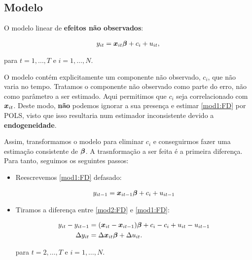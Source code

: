 \documentclass[11pt,oneside,a4paper]{article}
\numberwithin{equation}{section}
\begin{document}
\begin{description}
\subsection*{Modelo}

O modelo linear de \textbf{efeitos não observados}:

\vspace{-1 em}
\begin{align} \label{mod1:FD}
	y_{it} = \boldsymbol{x}_{it} \boldsymbol{\beta} + c_{i} + u_{it},
\end{align}

\noindent
para
$t = 1, \dots, T$ e $i = 1, \dots, N$.

O modelo contém explicitamente um componente não observado, $c_{i}$, que não varia no tempo.
Tratamos o componente não observado como parte do erro, não como parâmetro a ser estimado.
Aqui permitimos que $c_{i}$ seja correlacionado com $\boldsymbol{x}_{it}$.
Deste modo, \textbf{não} podemos ignorar a sua presença e estimar \eqref{mod1:FD} por POLS, visto que isso resultaria num estimador inconsistente devido a \textbf{endogeneidade}.

Assim, transformamos o modelo para eliminar $c_{i}$ e conseguirmos fazer uma estimação consistente de $\boldsymbol{\beta}$.
A trasnformação a ser feita é a primeira diferença.
Para tanto, seguimos os seguintes passos:

\begin{itemize}\itemsep0pt
\item Reescrevemos \eqref{mod1:FD} defasado:

\vspace{-1 em}
\begin{align}  \label{mod2:FD}
	y_{it-1} = \boldsymbol{x}_{it-1} \boldsymbol{\beta} + c_{i} + u_{it-1}
\end{align}

\item Tiramos a diferença entre \eqref{mod2:FD} e \eqref{mod1:FD}:

\vspace{-1 em}
\begin{align}
\nonumber
y_{it} - y_{it-1} &=
(\boldsymbol{x}_{it} - \boldsymbol{x}_{it-1}) \boldsymbol{\beta} +
c_{i} - c_{i} +
u_{it} - u_{it-1}
\\
\label{mod3:FD}
\Delta y_{it} &=
\Delta \boldsymbol{x}_{it} \boldsymbol{\beta} +
\Delta u_{it}. 
\end{align}

\noindent
para
$t = 2, \dots, T$ e $i = 1, \dots, N$.
\end{itemize}


\end{description}
\end{document}

